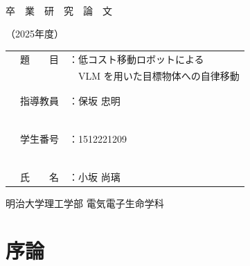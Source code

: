 \documentclass[a4paper,11pt]{ltjsreport}
\begin{document}
\begin{titlepage}
  \centering
  ~~\vspace{1cm}
 
  {\Huge 卒　業　研　究　論　文 \par}
  {\Huge （2025年度）\par}

  \vspace{8cm}

  \begin{tabular}{rl}
    {\LARGE 題　　目}　 & {\LARGE ：低コスト移動ロボットによる} \\
                         & {\LARGE ~~VLM を用いた目標物体への自律移動} \\ \\ \\
    {\LARGE 指導教員}　 & {\LARGE ：保坂 忠明} \\　 \\ \\
    {\LARGE 学生番号}　 & {\LARGE ：1512221209} \\　 \\ \\
    {\LARGE 氏　　名}　 & {\LARGE ：小坂 尚璃}
  \end{tabular}

  \vfil
  \begin{flushright}
    明治大学理工学部 電気電子生命学科
  \end{flushright}
\end{titlepage}

\tableofcontents

\chapter{序論}
\label{chap:intro}
\end{document}
